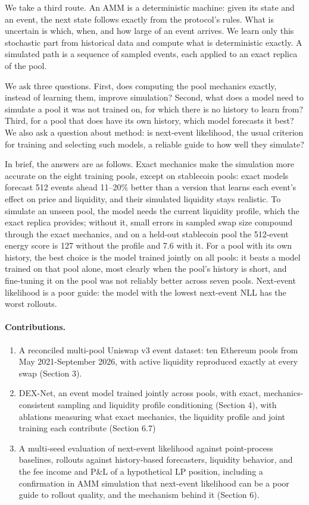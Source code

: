 \documentclass[11pt]{article}
\begin{document}
We take a third route. An AMM is a deterministic machine: given its state and an event, the next state follows exactly from the protocol's rules. What is uncertain is which, when, and how large of an event arrives. We learn only this stochastic part from historical data and compute what is deterministic exactly. A simulated path is a sequence of sampled events, each applied to an exact replica of the pool.

We ask three questions. First, does computing the pool mechanics exactly, instead of learning them, improve simulation? Second, what does a model need to simulate a pool it was not trained on, for which there is no history to learn from? Third, for a pool that does have its own history, which model forecasts it best? We also ask a question about method: is next-event likelihood, the usual criterion for training and selecting such models, a reliable guide to how well they simulate?

In brief, the answers are as follows. Exact mechanics make the simulation more accurate on the eight training pools, except on stablecoin pools: exact models forecast 512 events ahead 11--20\% better than a version that learns each event's effect on price and liquidity, and their simulated liquidity stays realistic. To simulate an unseen pool, the model needs the current liquidity profile, which the exact replica provides; without it, small errors in sampled swap size compound through the exact mechanics, and on a held-out stablecoin pool the 512-event energy score is 127 without the profile and 7.6 with it. For a pool with its own history, the best choice is the model trained jointly on all pools: it beats a model trained on that pool alone, most clearly when the pool's history is short, and fine-tuning it on the pool was not reliably better across seven pools. Next-event likelihood is a poor guide: the model with the lowest next-event NLL has the worst rollouts.

\paragraph{Contributions.}

\begin{enumerate}
\item A reconciled multi-pool Uniswap v3 event dataset: ten Ethereum pools from May 2021-September 2026, with active liquidity reproduced exactly at every swap (Section 3).
\item DEX-Net, an event model trained jointly across pools, with exact, mechanics-consistent sampling and liquidity profile conditioning (Section 4), with ablations measuring what exact mechanics, the liquidity profile and joint training each contribute (Section 6.7)
\item A multi-seed evaluation of next-event likelihood against point-process baselines, rollouts against history-based forecasters, liquidity behavior, and the fee income and P\&L of a hypothetical LP position, including a confirmation in AMM simulation that next-event likelihood can be a poor guide to rollout quality, and the mechanism behind it (Section 6).
\end{enumerate}
\end{document}
